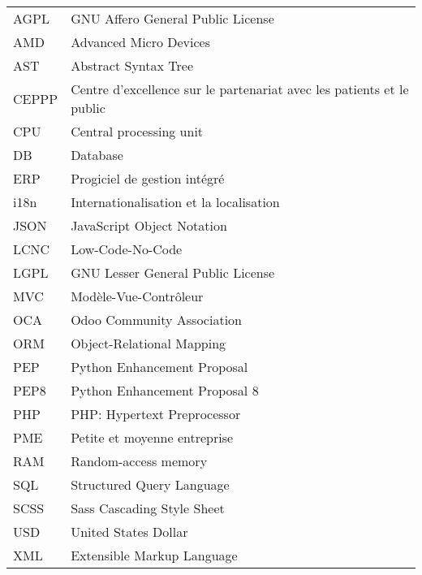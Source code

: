 \chapter*{\abbrevname}
\pagestyle{pagenumber}
%
\begin{acronym}
\end{acronym}
%
\begin{longtable}{lp{5in}}
AGPL      & GNU Affero General Public License\\
AMD       & Advanced Micro Devices\\
AST       & Abstract Syntax Tree\\
CEPPP     & Centre d'excellence sur le partenariat avec les patients et le public\\
CPU       & Central processing unit\\
DB        & Database\\
ERP       & Progiciel de gestion intégré\\
i18n      & Internationalisation et la localisation\\
JSON      & JavaScript Object Notation\\
LCNC      & Low-Code-No-Code\\
LGPL      & GNU Lesser General Public License\\
MVC       & Modèle-Vue-Contrôleur\\
OCA       & Odoo Community Association\\
ORM       & Object-Relational Mapping\\
PEP       & Python Enhancement Proposal\\
PEP8      & Python Enhancement Proposal 8\\
PHP       & PHP: Hypertext Preprocessor\\
PME       & Petite et moyenne entreprise\\
RAM       & Random-access memory\\
SQL       & Structured Query Language\\
SCSS      & Sass Cascading Style Sheet\\
USD       & United States Dollar\\
XML       & Extensible Markup Language\\

\end{longtable}
